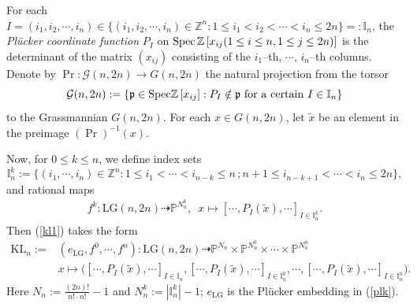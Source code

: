 \documentclass[10pt]{amsart}
\theoremstyle{definition}
\newcommand{\LG}{\operatorname{LG}}
\newcommand{\KL}{\mathrm{KL}}
\theoremstyle{plain} %
\begin{document}
For each $I=(i_1,i_2,\cdots,i_n)\in\{(i_1,i_2,\cdots,i_n)\in\mathbb Z^n:1\leq i_1<i_2<\cdots<i_n\leq 2n\}=:\mathbb I_n$, the {\it Pl\"ucker coordinate function} $P_{I}$ on ${\rm Spec}\,\mathbb Z\left[x_{ij}(1\leq i\leq n,1\leq j\leq 2n)\right]$ is the determinant of the matrix $(x_{ij})$ consisting of the $i_1$--{th}, $\cdots$, $i_n$--{th} columns. Denote by $\operatorname{Pr}\colon\mathcal G(n,2n)\rightarrow G(n,2n)$  the natural projection from the torsor
\begin{equation*}%
\mathcal G(n,2n):=\left\{\mathfrak p\in{\rm Spec}\mathbb Z\left[x_{ij}\right]
:P_{I}\notin\mathfrak p\,\,{\rm for\,\,a\,\,certain\,\,}I\in\mathbb I_{n}\right\} 
\end{equation*} 
to the Grassmannian $G(n,2n)$. For each $x\in G(n,2n)$, let $\widetilde{x}$ be an element in the preimage $(\operatorname{Pr})^{-1}(x)$.

Now, for $0\leq k\leq n$, we
define index sets
\begin{equation*}%
\mathbb I_{n}^{k}:=\big\{(i_1,\cdots,i_n)\in\mathbb Z^n:{ 1\leq i_1<\cdots<i_{n-k}\leq n\,;n+1\leq i_{n-k+1}<\cdots<i_n\leq 2n}\},
\end{equation*}
and rational maps
\begin{equation}\label{fk}
\begin{split}
f^k\colon\mathrm{LG}(n,2n)\dashrightarrow\mathbb {P}^{N^k_{n}},\,\,\,x\mapsto[\cdots,P_I(\widetilde x),\cdots]_{I\in\mathbb I^k_{n}}.
\end{split}   
\end{equation}
Then (\ref{kl1}) takes the form
\begin{equation}\label{fskl}
\begin{split}
\KL_{n}:=&(e_{\mathrm{LG}}, f^0,\cdots,f^n)\colon\mathrm{LG}(n,2n)\dashrightarrow\mathbb {P}^{N_{n}}\times\mathbb {P}^{N^0_{n}}\times\cdots\times\mathbb {P}^{N^n_{n}}\\ 
&x\mapsto\big( [\cdots ,P_I(\widetilde x),\cdots]_{I\in\mathbb I_{n}},[\cdots,P_I(\widetilde x),\cdots]_{I\in\mathbb I^0_{n}},\cdots,[\cdots,P_I(\widetilde x),\cdots]_{I\in\mathbb I^n_{n}}\big).
\end{split}
\end{equation}
Here $N_{n}:=\frac{(2n)!}{n!\cdot n!}-1$ and $N_n^k:=|\mathbb I_{n}^{k}|-1$; $e_{\LG}$ is the Pl\"ucker embedding in (\ref{plk}).
\end{document}
